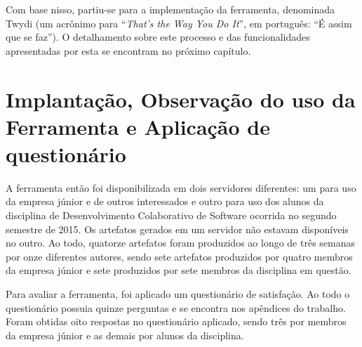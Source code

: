 Com base nisso, partiu-se para a implementação da ferramenta, denominada Twydi (um acrônimo para ``\textit{That's the Way You Do It}'', em português: ``É assim que se faz''). O detalhamento sobre este processo e das funcionalidades apresentadas por esta se encontram no próximo capítulo.

\section{Implantação, Observação do uso da Ferramenta e Aplicação de questionário}

A ferramenta então foi disponibilizada em dois servidores diferentes: um para uso da empresa júnior e de outros interessados e outro para uso dos alunos da disciplina de Desenvolvimento Colaborativo de Software ocorrida no segundo semestre de 2015. Os artefatos gerados em um servidor não estavam disponíveis no outro. Ao todo, quatorze artefatos foram produzidos ao longo de três semanas por onze diferentes autores, sendo sete artefatos produzidos por quatro membros da empresa júnior e sete produzidos por sete membros da disciplina em questão.

Para avaliar a ferramenta, foi aplicado um questionário de satisfação. Ao todo o questionário possuia quinze perguntas e se encontra nos apêndices do trabalho. Foram obtidas oito respostas no questionário aplicado, sendo três por membros da empresa júnior e as demais por alunos da disciplina. 

